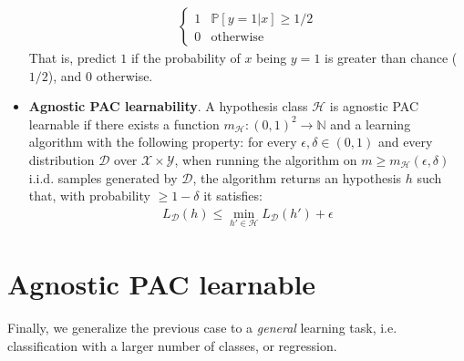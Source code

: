 \documentclass[../template.tex]{subfiles}
\begin{document}
\begin{itemize}
\begin{align*}
\begin{cases}
            1 & \mathbb{P}[y=1|x] \geq 1/2\\
            0 & \text{otherwise}
        \end{cases}
    \end{align*} 
    That is, predict $1$ if the probability of $x$ being $y=1$ is greater than chance ($1/2$), and $0$ otherwise.
    \item \textbf{Agnostic PAC learnability}. A hypothesis class $\mathcal{H}$ is agnostic PAC learnable if there exists a function $m_{\mathcal{H}}\colon (0,1)^2 \to \mathbb{N}$ and a learning algorithm with the following property: for every $\epsilon, \delta \in (0,1)$ and every distribution $\mathcal{D}$ over $\mathcal{X}\times \mathcal{Y}$, when running the algorithm on $m \geq m_{\mathcal{H}}(\epsilon, \delta)$ i.i.d. samples generated by $\mathcal{D}$, the algorithm returns an hypothesis $h$ such that, with probability $\geq 1 -\delta$ it satisfies:
    \begin{align*}
        L_{\mathcal{D}}(h) \leq \min_{h' \in \mathcal{H}} L_{\mathcal{D}} (h') + \epsilon
    \end{align*} 

\end{itemize}

\section{Agnostic PAC learnable}
Finally, we generalize the previous case to a \textit{general} learning task, i.e. classification with a larger number of classes, or regression.
\end{document}
